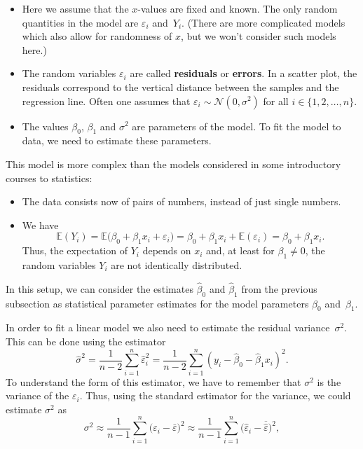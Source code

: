 \documentclass[
  a4paper,
]{article}
\providecommand{\tightlist}{%
  \setlength{\itemsep}{0pt}\setlength{\parskip}{0pt}}
\theoremstyle{definition}
\theoremstyle{definition}
\theoremstyle{definition}
\theoremstyle{definition}
\theoremstyle{remark}
\begin{document}
\begin{itemize}
\tightlist
\item
  Here we assume that the \(x\)-values are fixed and known. The only
  random quantities in the model are \(\varepsilon_i\) and~\(Y_i\). (There are
  more complicated models which also allow for randomness of \(x\), but
  we won't consider such models here.)
\item
  The random variables \(\varepsilon_i\) are called \textbf{residuals} or
  \textbf{errors}. In a scatter plot, the residuals correspond to the
  vertical distance between the samples and the regression line.
  Often one assumes that \(\varepsilon_i \sim \mathcal{N}(0, \sigma^2)\) for all
  \(i \in \{1, 2, \ldots, n\}\).
\item
  The values \(\beta_0\), \(\beta_1\) and \(\sigma^2\) are parameters of
  the model. To fit the model to data, we need to estimate these
  parameters.
\end{itemize}

This model is more complex than the models considered in some
introductory courses to statistics:

\begin{itemize}
\tightlist
\item
  The data consists now of pairs of numbers, instead of just
  single numbers.
\item
  We have
  \begin{equation*}
    \mathbb{E}(Y_i)
    = \mathbb{E}\bigl( \beta_0 + \beta_1 x_i + \varepsilon_i \bigr)
    = \beta_0 + \beta_1 x_i + \mathbb{E}(\varepsilon_i)
    = \beta_0 + \beta_1 x_i.
  \end{equation*}
  Thus, the expectation of \(Y_i\) depends on \(x_i\) and, at least for
  \(\beta_1 \neq 0\), the random variables \(Y_i\) are not identically
  distributed.
\end{itemize}

In this setup, we can consider the estimates \(\hat\beta_0\) and \(\hat\beta_1\)
from the previous subsection as statistical parameter estimates for the
model parameters \(\beta_0\) and~\(\beta_1\).

In order to fit a linear model we also need to estimate the residual
variance~\(\sigma^2\). This can be done using the estimator
\begin{equation}
  \hat\sigma^2
  = \frac{1}{n-2} \sum_{i=1}^n \hat\varepsilon_i^2
  = \frac{1}{n-2} \sum_{i=1}^n (y_i - \hat\beta_0 - \hat\beta_1 x_i)^2.
  \label{eq:reg-sigma-est}
\end{equation}
To understand the form of this estimator, we have to remember that
\(\sigma^2\) is the variance of the \(\varepsilon_i\). Thus, using the standard
estimator for the variance, we could estimate \(\sigma^2\) as
\begin{equation}
  \sigma^2
  \approx \frac{1}{n-1} \sum_{i=1}^n \bigl(\varepsilon_i - \bar\varepsilon\bigr)^2
  \approx \frac{1}{n-1} \sum_{i=1}^n \bigl(\hat\varepsilon_i - \overline{\hat\varepsilon}\bigr)^2,
  \label{eq:resid-var-est}
\end{equation}
\end{document}
